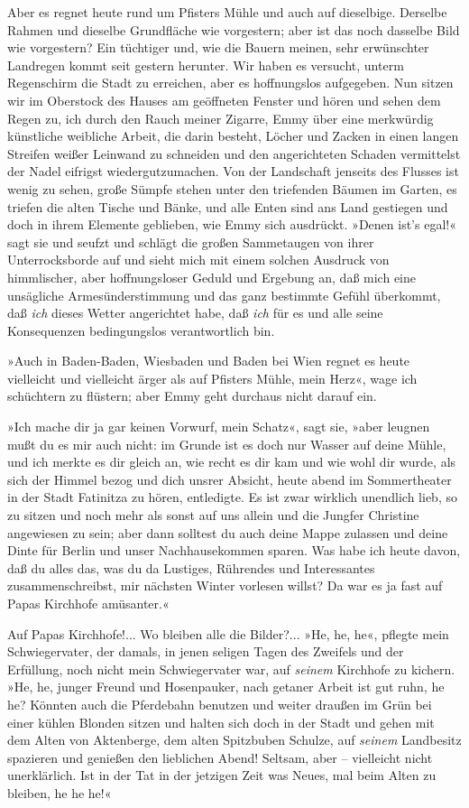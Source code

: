 Aber es regnet heute rund um Pfisters Mühle und auch auf
dieselbige. Derselbe Rahmen und dieselbe Grundfläche wie
vorgestern; aber ist das noch dasselbe Bild wie vorgestern? Ein
tüchtiger und, wie die Bauern meinen, sehr erwünschter Landregen
kommt seit gestern herunter. Wir haben es versucht, unterm
Regenschirm die Stadt zu erreichen, aber es hoffnungslos
aufgegeben. Nun sitzen wir im Oberstock des Hauses am geöffneten
Fenster und hören und sehen dem Regen zu, ich durch den Rauch
meiner Zigarre, Emmy über eine merkwürdig künstliche weibliche
Arbeit, die darin besteht, Löcher und Zacken in einen langen
Streifen weißer Leinwand zu schneiden und den angerichteten Schaden
vermittelst der Nadel eifrigst wiedergutzumachen. Von der
Landschaft jenseits des Flusses ist wenig zu sehen, große Sümpfe
stehen unter den triefenden Bäumen im Garten, es triefen die alten
Tische und Bänke, und alle Enten sind ans Land gestiegen und doch
in ihrem Elemente geblieben, wie Emmy sich ausdrückt. »Denen ist's
egal!« sagt sie und seufzt und schlägt die großen Sammetaugen von
ihrer Unterrocksborde auf und sieht mich mit einem solchen Ausdruck
von himmlischer, aber hoffnungsloser Geduld und Ergebung an, daß
mich eine unsägliche Armesünderstimmung und das ganz bestimmte
Gefühl überkommt, daß \emph{ich} dieses Wetter angerichtet habe,
daß \emph{ich} für es und alle seine Konsequenzen bedingungslos
verantwortlich bin.

»Auch in Baden-Baden, Wiesbaden und Baden bei Wien regnet es heute
vielleicht und vielleicht ärger als auf Pfisters Mühle, mein Herz«,
wage ich schüchtern zu flüstern; aber Emmy geht durchaus nicht
darauf ein.

»Ich mache dir ja gar keinen Vorwurf, mein Schatz«, sagt sie, »aber
leugnen mußt du es mir auch nicht: im Grunde ist es doch nur Wasser
auf deine Mühle, und ich merkte es dir gleich an, wie recht es dir
kam und wie wohl dir wurde, als sich der Himmel bezog und dich
unsrer Absicht, heute abend im Sommertheater in der Stadt Fatinitza
zu hören, entledigte. Es ist zwar wirklich unendlich lieb, so zu
sitzen und noch mehr als sonst auf uns allein und die Jungfer
Christine angewiesen zu sein; aber dann solltest du auch deine
Mappe zulassen und deine Dinte für Berlin und unser Nachhausekommen
sparen. Was habe ich heute davon, daß du alles das, was du da
Lustiges, Rührendes und Interessantes zusammenschreibst, mir
nächsten Winter vorlesen willst? Da war es ja fast auf Papas
Kirchhofe amüsanter.«

Auf Papas Kirchhofe!... Wo bleiben alle die Bilder?... »He, he,
he«, pflegte mein Schwiegervater, der damals, in jenen seligen
Tagen des Zweifels und der Erfüllung, noch nicht mein
Schwiegervater war, auf \emph{seinem} Kirchhofe zu kichern. »He,
he, junger Freund und Hosenpauker, nach getaner Arbeit ist gut
ruhn, he he? Könnten auch die Pferdebahn benutzen und weiter
draußen im Grün bei einer kühlen Blonden sitzen und halten sich
doch in der Stadt und gehen mit dem Alten von Aktenberge, dem alten
Spitzbuben Schulze, auf \emph{seinem} Landbesitz spazieren und
genießen den lieblichen Abend! Seltsam, aber – vielleicht nicht
unerklärlich. Ist in der Tat in der jetzigen Zeit was Neues, mal
beim Alten zu bleiben, he he he!«

